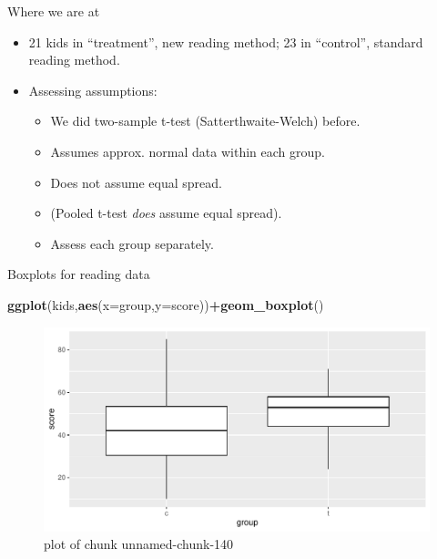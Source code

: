 \documentclass[ignorenonframetext,]{beamer}
\newenvironment{Shaded}{\begin{snugshade}}{\end{snugshade}}
\newcommand{\DataTypeTok}[1]{\textcolor[rgb]{0.13,0.29,0.53}{#1}}
\newcommand{\KeywordTok}[1]{\textcolor[rgb]{0.13,0.29,0.53}{\textbf{#1}}}
\newcommand{\NormalTok}[1]{#1}
\newcommand{\OperatorTok}[1]{\textcolor[rgb]{0.81,0.36,0.00}{\textbf{#1}}}
\providecommand{\tightlist}{%
  \setlength{\itemsep}{0pt}\setlength{\parskip}{0pt}}
\begin{document}
\begin{frame}{Where we are at}
\protect\hypertarget{where-we-are-at}{}

\begin{itemize}
\item
  21 kids in ``treatment'', new reading method; 23 in ``control'',
  standard reading method.
\item
  Assessing assumptions:

  \begin{itemize}
  \tightlist
  \item
    We did two-sample t-test (Satterthwaite-Welch) before.
  \item
    Assumes approx. normal data within each group.
  \item
    Does not assume equal spread.
  \item
    (Pooled t-test \emph{does} assume equal spread).
  \item
    Assess each group separately.
  \end{itemize}
\end{itemize}

\end{frame}

\begin{frame}[fragile]{Boxplots for reading data}
\protect\hypertarget{boxplots-for-reading-data}{}

\begin{Shaded}
\begin{Highlighting}[]
\KeywordTok{ggplot}\NormalTok{(kids,}\KeywordTok{aes}\NormalTok{(}\DataTypeTok{x=}\NormalTok{group,}\DataTypeTok{y=}\NormalTok{score))}\OperatorTok{+}\KeywordTok{geom_boxplot}\NormalTok{()}
\end{Highlighting}
\end{Shaded}

\begin{figure}
\centering
\includegraphics{figure/unnamed-chunk-140-1.pdf}
\caption{plot of chunk unnamed-chunk-140}
\end{figure}

\end{frame}
\end{document}
